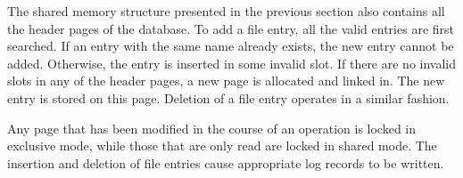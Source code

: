 The shared memory structure   presented in the previous  section  also
contains all the header  pages of the  database. To add a file  entry,
all the valid  entries are first searched. If  an entry  with the same
name already exists,   the new entry cannot  be  added. Otherwise, the
entry is inserted in some invalid slot. If there  are no invalid slots
in any of the header pages, a new page is allocated and linked in. The
new entry is stored on this page. Deletion of a file entry operates in
a similar fashion.

Any page  that has  been  modified in the course   of an operation  is
locked in exclusive mode, while those that are only read are locked in
shared  mode.  The  insertion  and  deletion  of   file entries  cause
appropriate log records to be written.

